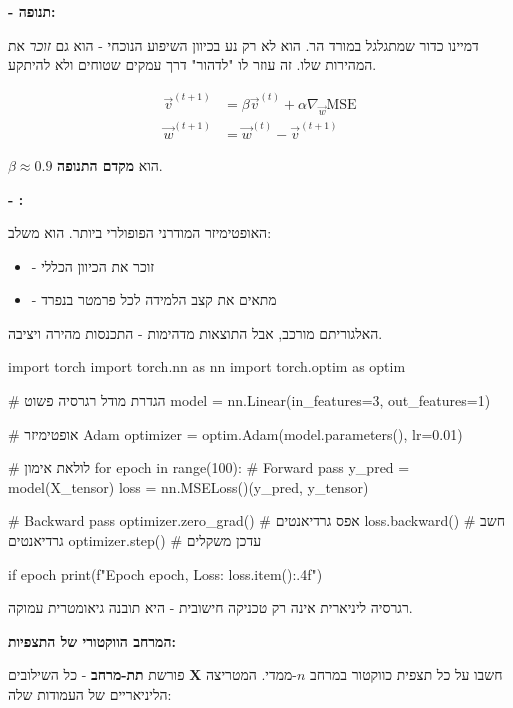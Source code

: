 \textbf{ - תנופה:}

דמיינו כדור שמתגלגל במורד הר. הוא לא רק נע בכיוון השיפוע הנוכחי - הוא גם \textit{זוכר} את המהירות שלו. זה עוזר לו "לדהור" דרך עמקים שטוחים ולא להיתקע.

\begin{align}
\vec{v}^{(t+1)} &= \beta \vec{v}^{(t)} + \alpha \nabla_{\vec{w}} \text{MSE} \\
\vec{w}^{(t+1)} &= \vec{w}^{(t)} - \vec{v}^{(t+1)}
\end{align}

$\beta \approx 0.9$ הוא \textbf{מקדם התנופה}.

\textbf{ - :}

האופטימיזר המודרני הפופולרי ביותר. הוא משלב:
\begin{itemize}
\item {} - זוכר את הכיוון הכללי
\item {} - מתאים את קצב הלמידה לכל פרמטר בנפרד
\end{itemize}

האלגוריתם מורכב, אבל התוצאות מדהימות - התכנסות מהירה ויציבה.

\begin{pythonbox}
import torch
import torch.nn as nn
import torch.optim as optim

# הגדרת מודל רגרסיה פשוט
model = nn.Linear(in_features=3, out_features=1)

# אופטימיזר Adam
optimizer = optim.Adam(model.parameters(), lr=0.01)

# לולאת אימון
for epoch in range(100):
    # Forward pass
    y_pred = model(X_tensor)
    loss = nn.MSELoss()(y_pred, y_tensor)
    
    # Backward pass
    optimizer.zero_grad()  # אפס גרדיאנטים
    loss.backward()        # חשב גרדיאנטים
    optimizer.step()       # עדכן משקלים
    
    if epoch %
        print(f"Epoch {epoch}, Loss: {loss.item():.4f}")
\end{pythonbox}


רגרסיה ליניארית אינה רק טכניקה חישובית - היא תובנה גיאומטרית עמוקה.

\textbf{המרחב הווקטורי של התצפיות:}

חשבו על כל תצפית כווקטור במרחב $n$-ממדי. המטריצה $\mathbf{X}$ פורשת \textbf{תת-מרחב} - כל השילובים הליניאריים של העמודות שלה:

